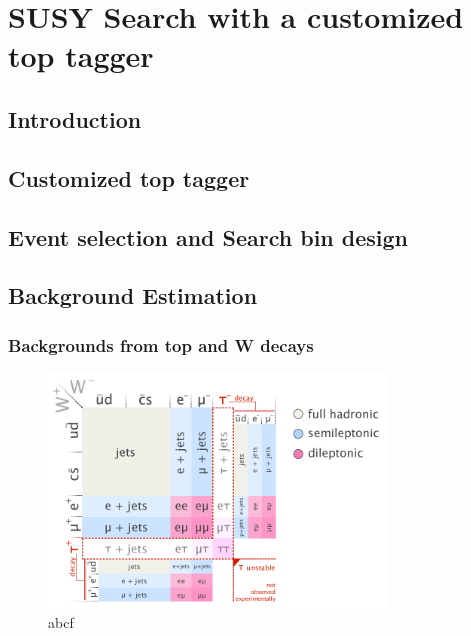 \chapter{SUSY Search with a customized top tagger}

\clearpage
\section{Introduction}
\label{sec:c4intro}


\clearpage
\section{Customized top tagger}

\clearpage
\section{Event selection and Search bin design}
\label{sec:c4evssbd}


\clearpage
\section{Background Estimation}

\clearpage
\subsection{Backgrounds from top and W decays}
\begin{figure}[htbp]
 \begin{center}
  \includegraphics[width=0.8\textwidth]{figures/c4/c4_top_w_decaymod.png}
 \end{center}
 \caption{abcf}
 \label{fig:c4twdecaymod}
\end{figure}

